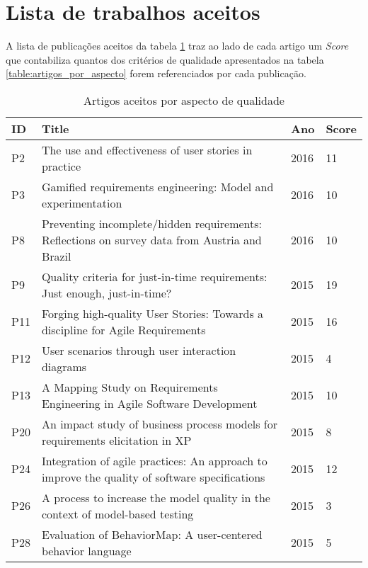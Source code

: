\appendices
\section{Lista de trabalhos aceitos}

A lista de publicações aceitos da tabela \ref{table:artigos_aceitos} traz ao lado de cada artigo um \textit{Score} que contabiliza quantos dos critérios de qualidade apresentados na tabela \ref{table:artigos_por_aspecto} forem referenciados por cada publicação.

\begin{table}[!t]
\renewcommand{\arraystretch}{1.3}
\caption{Artigos aceitos por aspecto de qualidade}
\label{table:artigos_aceitos}
\centering
\begin{tabular}{|m{0.4cm}|m{4cm}|m{0.5cm}|m{0.5cm}|}
\hline
ID & Title & Ano & Score \\
\hline\hline
P2 & The use and effectiveness of user stories in practice & 2016 & 11 \\
\hline
P3 & Gamified requirements engineering: Model and experimentation & 2016 & 10 \\ 
\hline
P8 & Preventing incomplete/hidden requirements: Reflections on survey data from Austria and Brazil & 2016 & 10 \\ 
\hline
P9 & Quality criteria for just-in-time requirements: Just enough, just-in-time? & 2015 & 19 \\ 
\hline
P11 & Forging high-quality User Stories: Towards a discipline for Agile Requirements & 2015 & 16 \\ 
\hline
P12 & User scenarios through user interaction diagrams & 2015 & 4 \\ 
\hline
P13 & A Mapping Study on Requirements Engineering in Agile Software Development & 2015 & 10 \\ 
\hline
P20 & An impact study of business process models for requirements elicitation in XP & 2015 & 8 \\ 
\hline
P24 & Integration of agile practices: An approach to improve the quality of software specifications & 2015 & 12 \\ 
\hline
P26 & A process to increase the model quality in the context of model-based testing & 2015 & 3 \\ 
\hline
P28 & Evaluation of BehaviorMap: A user-centered behavior language & 2015 & 5 \\ 

\end{tabular}
\end{table}
